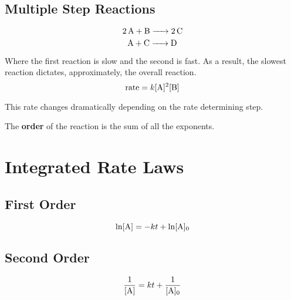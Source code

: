 \documentclass{article}
\begin{document}
\subsection{ Multiple Step Reactions }

$$ \ce{ 2A + B -> 2C } $$
$$ \ce{ A + C -> D } $$

Where the first reaction is slow and the second is fast. As a result, the
slowest reaction dictates, approximately, the overall reaction.
$$ \mathrm{ rate } = k [ \ce{ A } ]^{2} [ \ce{ B } ] $$

This rate changes dramatically depending on the rate determining step. 

\bigbreak

The \textbf{order} of the reaction is the sum of all the exponents. 

\section{ Integrated Rate Laws }

\subsection{ First Order }

$$ \ln [ \ce{ A } ] = -kt + \ln[ \ce{ A } ]_{0} $$

\subsection{ Second Order }

$$ \frac{ 1 }{ [ \ce{ A } ] } = kt + \frac{ 1 }{ [ \ce{ A } ]_{0} } $$
\end{document}
